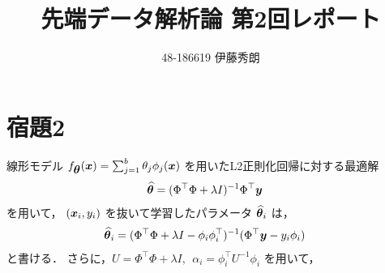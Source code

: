 \documentclass[onecolumn]{preport}
\title{先端データ解析論 第2回レポート}
\author{48-186619 伊藤秀朗}
\def\vector#1{\mbox{\boldmath $#1$}}
\begin{document}
\pagestyle{empty}
\maketitle
\thispagestyle{empty}
\sloppy

\section{宿題2}
\def\Phii{\Phi_i}
\def\phii{\phi_i}
\def\xv{\vector{x}}
\def\thetav{\vector{\theta}}
\def\thetil{\vector{\widehat\theta}}
線形モデル \(f_{\thetav}(\xv) = \sum_{j=1}^{b}\theta_j\phi_j(\xv)\) を用いたL2正則化回帰に対する最適解
\begin{align}
  \thetil &= (\Phi^\top \Phi + \lambda I)^{-1} \Phi^\top \vector{y}
\end{align}
を用いて， \((\xv_i, y_i)\) を抜いて学習したパラメータ \(\thetil_i\) は，
\begin{align}
  \thetil_i &= (\Phi^\top \Phi + \lambda I - \phi_i \phi_i^\top)^{-1} (\Phi^\top \vector{y} - y_i \phi_i)
\end{align}
と書ける．
さらに，\(U = \Phi^\top \Phi + \lambda I, \ \ \alpha_i = \phii^\top U^{-1} \phi_i\) を用いて，
\end{document}
